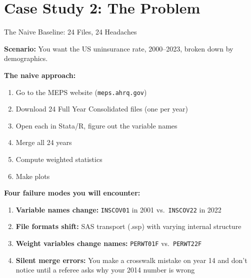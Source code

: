 \documentclass[10pt,english,aspectratio=169]{beamer}
\begin{document}
\section{Case Study 2: The Problem}

\begin{frame}{The Naive Baseline: 24 Files, 24 Headaches}

\textbf{Scenario:} You want the US uninsurance rate, 2000--2023, broken down by demographics.

\vspace{0.2cm}
\textbf{The naive approach:}
\begin{enumerate}
    \item Go to the MEPS website (\texttt{meps.ahrq.gov})
    \item Download 24 Full Year Consolidated files (one per year)
    \item Open each in Stata/R, figure out the variable names
    \item Merge all 24 years
    \item Compute weighted statistics
    \item Make plots
\end{enumerate}

\vspace{0.2cm}
\textbf{Four failure modes you will encounter:}
\begin{enumerate}
    \item \textbf{Variable names change:} \texttt{INSCOV01} in 2001 vs.\ \texttt{INSCOV22} in 2022
    \item \textbf{File formats shift:} SAS transport (.ssp) with varying internal structure
    \item \textbf{Weight variables change names:} \texttt{PERWT01F} vs.\ \texttt{PERWT22F}
    \item \textbf{Silent merge errors:} You make a crosswalk mistake on year 14 and don't notice until a referee asks why your 2014 number is wrong
\end{enumerate}

\end{frame}
\end{document}
